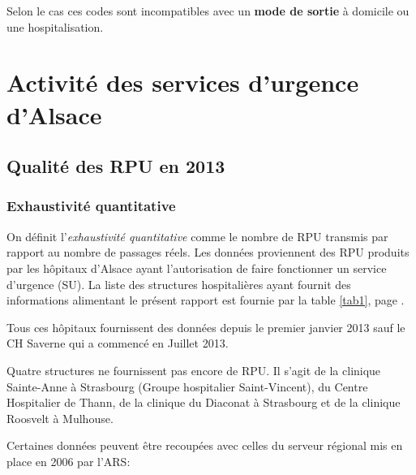 \documentclass[12pt,english,french,twoside]{book}\usepackage[]{graphicx}\usepackage[]{color}
\begin{document}
Selon le cas ces codes sont incompatibles avec un \textbf{mode de sortie} à domicile ou une hospitalisation.


\part{Activité des services d'urgence d'Alsace}


\newpage
\chapter{Qualité des RPU en 2013} %



\section{Exhaustivité quantitative}


On définit l'\emph{exhaustivité quantitative}  comme le nombre de RPU transmis par rapport au nombre de passages réels.
Les données proviennent des RPU produits par les hôpitaux d'Alsace ayant l'autorisation de faire fonctionner un service d'urgence (SU). La liste des structures hospitalières ayant fournit des informations alimentant le présent rapport est fournie par la table \ref{tab1}, page \pageref{tab1}.

Tous ces hôpitaux fournissent des données depuis le premier janvier 2013 sauf le CH Saverne qui a commencé en Juillet 2013.

Quatre structures ne fournissent pas encore de RPU. Il s'agit de la clinique Sainte-Anne à Strasbourg (Groupe hospitalier Saint-Vincent), du Centre Hospitalier de Thann, de la clinique du Diaconat à Strasbourg et de la clinique Roosvelt à Mulhouse.

Certaines données peuvent être recoupées avec celles du serveur régional mis en place en 2006 par l'ARS: 

\end{document}
